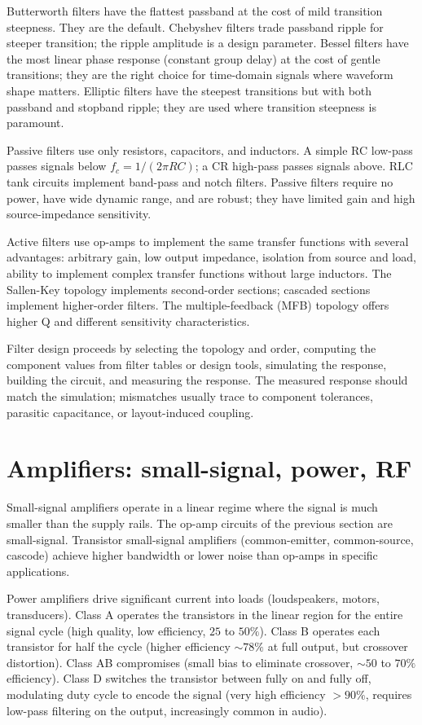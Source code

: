 Butterworth filters have the flattest passband at the cost of mild transition steepness. They are the default. Chebyshev filters trade passband ripple for steeper transition; the ripple amplitude is a design parameter. Bessel filters have the most linear phase response (constant group delay) at the cost of gentle transitions; they are the right choice for time-domain signals where waveform shape matters. Elliptic filters have the steepest transitions but with both passband and stopband ripple; they are used where transition steepness is paramount.

Passive filters use only resistors, capacitors, and inductors. A simple RC low-pass passes signals below $f_c = 1/(2\pi R C)$; a CR high-pass passes signals above. RLC tank circuits implement band-pass and notch filters. Passive filters require no power, have wide dynamic range, and are robust; they have limited gain and high source-impedance sensitivity.

Active filters use op-amps to implement the same transfer functions with several advantages: arbitrary gain, low output impedance, isolation from source and load, ability to implement complex transfer functions without large inductors. The Sallen-Key topology implements second-order sections; cascaded sections implement higher-order filters. The multiple-feedback (MFB) topology offers higher Q and different sensitivity characteristics.

Filter design proceeds by selecting the topology and order, computing the component values from filter tables or design tools, simulating the response, building the circuit, and measuring the response. The measured response should match the simulation; mismatches usually trace to component tolerances, parasitic capacitance, or layout-induced coupling.

\section{Amplifiers: small-signal, power, RF}

Small-signal amplifiers operate in a linear regime where the signal is much smaller than the supply rails. The op-amp circuits of the previous section are small-signal. Transistor small-signal amplifiers (common-emitter, common-source, cascode) achieve higher bandwidth or lower noise than op-amps in specific applications.

Power amplifiers drive significant current into loads (loudspeakers, motors, transducers). Class A operates the transistors in the linear region for the entire signal cycle (high quality, low efficiency, $25$ to $50\%$). Class B operates each transistor for half the cycle (higher efficiency $\sim 78\%$ at full output, but crossover distortion). Class AB compromises (small bias to eliminate crossover, $\sim 50$ to $70\%$ efficiency). Class D switches the transistor between fully on and fully off, modulating duty cycle to encode the signal (very high efficiency $> 90\%$, requires low-pass filtering on the output, increasingly common in audio).

